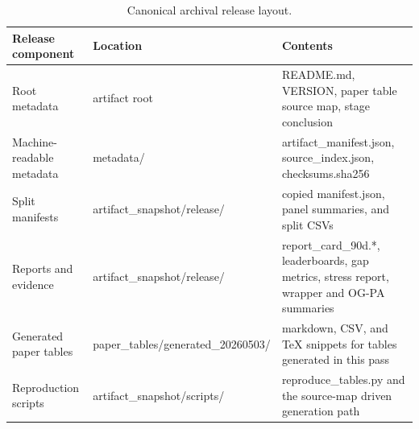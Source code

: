 \begin{table}[t]
\centering
\caption{Canonical archival release layout.}
\label{tab:table_24_release_layout}
\begin{tabular}{lll}
\toprule
Release component & Location & Contents \\
\midrule
Root metadata & artifact root & README.md, VERSION, paper table source map, stage conclusion \\
Machine-readable metadata & metadata/ & artifact\_manifest.json, source\_index.json, checksums.sha256 \\
Split manifests & artifact\_snapshot/release/ & copied manifest.json, panel summaries, and split CSVs \\
Reports and evidence & artifact\_snapshot/release/ & report\_card\_90d.*, leaderboards, gap metrics, stress report, wrapper and OG-PA summaries \\
Generated paper tables & paper\_tables/generated\_20260503/ & markdown, CSV, and TeX snippets for tables generated in this pass \\
Reproduction scripts & artifact\_snapshot/scripts/ & reproduce\_tables.py and the source-map driven generation path \\
\bottomrule
\end{tabular}
\end{table}
